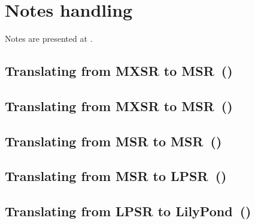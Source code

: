 



\chapter{Notes handling}\label{Notes handling}

Notes are presented at .


\section{Translating from MXSR to MSR\ (\mxsrToMsr{})}


\section{Translating from MXSR to MSR\ (\mxsrToMsr{})}


\section{Translating from MSR to MSR\ (\msrToMsr{})}


\section{Translating from MSR to LPSR\ (\msrToLpsr{})}


\section{Translating from LPSR to LilyPond\ (\lpsrToLilypond{})}


